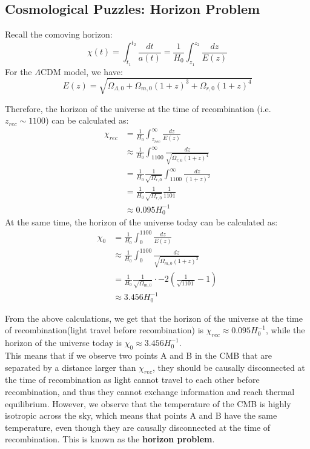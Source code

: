 \bigskip \noindent \bigskip \noindent \bigskip \noindent
\subsection{Cosmological Puzzles: Horizon Problem}
\begin{foundation}
    Recall the comoving horizon:
    \[
        \chi (t) = \int_{t_1}^{t_2} \frac{dt}{a(t)} = \frac{1}{H_0} \int_{z_1}^{z_2} \frac{dz}{E(z)}
    \]
    For the $\Lambda$CDM model, we have:
    \[
        E(z) = \sqrt{\Omega_{\Lambda,0} + \Omega_{m,0} (1 + z)^3 + \Omega_{r,0} (1 + z)^4}
    \]
    
    Therefore, the horizon of the universe at the time of recombination (i.e. $z_{rec} \sim 1100$) can be calculated as:
    \begin{align*}
        \chi_{rec} &= \frac{1}{H_0} \int_{z_{rec}}^{\infty} \frac{dz}{E(z)} \\
        &\approx \frac{1}{H_0} \int_{1100}^{\infty} \frac{dz}{\sqrt{\Omega_{r,0} (1 + z)^4}} \\
        &= \frac{1}{H_0} \frac{1}{\sqrt{\Omega_{r,0}}} \int_{1100}^{\infty} \frac{dz}{(1 + z)^2} \\
        &= \frac{1}{H_0} \frac{1}{\sqrt{\Omega_{r,0}}} \frac{1}{1101} \\
        &\approx 0.095 H_0^{-1}
    \end{align*}
    At the same time, the horizon of the universe today can be calculated as:
    \begin{align*}
        \chi_0 &= \frac{1}{H_0} \int_{0}^{1100} \frac{dz}{E(z)} \\
        &\approx \frac{1}{H_0} \int_{0}^{1100} \frac{dz}{\sqrt{\Omega_{m,0} (1 + z)^3}} \\
        &= \frac{1}{H_0} \frac{1}{\sqrt{\Omega_{m,0}}} \cdot -2 \left( \frac{1}{\sqrt{1101}} - 1 \right) \\
        &\approx 3.456 H_0^{-1}
    \end{align*}
\end{foundation}

\bigskip \noindent
\begin{intuition}
    From the above calculations, we get that the horizon of the universe at the time of recombination(light travel before recombination) is $\chi_{rec} \approx 0.095 H_0^{-1}$, while the horizon of the universe today is $\chi_0 \approx 3.456 H_0^{-1}$. \\

    This means that if we observe two points A and B in the CMB that are separated by a distance larger than $\chi_{rec}$, they should be causally disconnected at the time of recombination as light cannot travel to each other before recombination, and thus they cannot exchange information and reach thermal equilibrium. However, we observe that the temperature of the CMB is highly isotropic across the sky, which means that points A and B have the same temperature, even though they are causally disconnected at the time of recombination. This is known as the \textbf{horizon problem}.
\end{intuition}

